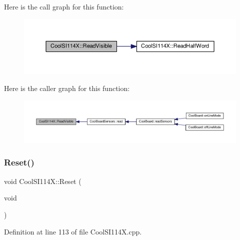 Here is the call graph for this function\+:
\nopagebreak
\begin{figure}[H]
\begin{center}
\leavevmode
\includegraphics[width=350pt]{class_cool_s_i114_x_a42e0e574256341443c647a4c0eda87d5_cgraph}
\end{center}
\end{figure}
Here is the caller graph for this function\+:
\nopagebreak
\begin{figure}[H]
\begin{center}
\leavevmode
\includegraphics[width=350pt]{class_cool_s_i114_x_a42e0e574256341443c647a4c0eda87d5_icgraph}
\end{center}
\end{figure}
\mbox{\label{class_cool_s_i114_x_a9d9f9c9129c0c29ed497f8563f3dd823}} 
\subsubsection{\texorpdfstring{Reset()}{Reset()}}
{\footnotesize\ttfamily void Cool\+S\+I114\+X\+::\+Reset (\begin{DoxyParamCaption}\item[{void}]{ }\end{DoxyParamCaption})}



Definition at line 113 of file Cool\+S\+I114\+X.\+cpp.

